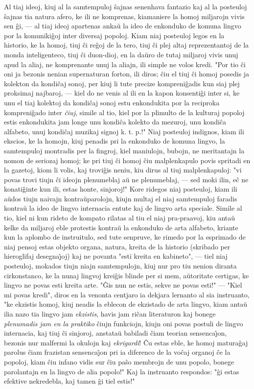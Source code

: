    Al tiaj ideoj, kiuj al la samtempuloj \^sajnas senenhava fantazio
kaj al la posteuloj \^sajnas tia natura afero, ke ili ne komprenas,
kiamaniere la homoj miljarojn vivis sen \^gi, --- al tiaj ideoj
apartenas anka\u u la ideo de enkonduko de komuna lingvo por la
komuniki\^goj inter diversaj popoloj. Kiam niaj posteuloj legos en
la historio, ke la homoj, tiuj \^ci re\^goj de la tero, tiuj \^ci
plej altaj reprezentantoj de la monda inteligenteco, tiuj \^ci
duon-dioj, en la da\u uro de tutaj miljaroj vivis unuj apud la
aliaj, ne komprenante unuj la aliajn, ili simple ne volos kredi.
"Por tio \^ci oni ja bezonis nenian supernaturan forton, ili diros;
\^ciu el tiuj \^ci homoj posedis ja kolekton da kondi\^caj sonoj,
per kiuj li tute precize kompreni\^gadis kun siaj plej proksimaj
najbaroj, --- kiel do ne venis al ili en la kapon konsenti\^gi inter
si, ke unu el tiaj kolektoj da kondi\^caj sonoj estu enkondukita por
la reciproka kompreni\^gado inter {\sl \^ciuj}, simile al tio, kiel
por la plimulto de la kulturaj popoloj estis enkondukita jam longe
unu kondi\^ca kolekto da mezuroj, unu kondi\^ca alfabeto, unuj
kondi\^caj muzikaj signoj k. t. p.!" Niaj posteuloj indignos, kiam
ili ekscios, ke la homojn, kiuj penadis pri la enkonduko de komuna
lingvo, la samtempuloj montradis per la fingroj, kiel maniulojn,
bubojn, ne meritantajn la nomon de seriozaj homoj; ke pri tiuj \^ci
homoj \^ciu malplenkapulo povis spritadi en la gazetoj, kiom li
volis, kaj trovi\^gis neniu, kiu dirus al tiuj malplenkapuloj: "vi
povas trovi tiujn \^ci ideojn plenumeblaj a\u u ne plenumeblaj,
--- sed moki ilin, e\^c ne konati\^ginte kun ili, estas honte,
sinjoroj!" Kore ridegos niaj posteuloj, kiam ili a\u udos tiujn
naivajn kontra\u uparolojn, kiujn multaj el niaj samtempuloj faradis
kontra\u u la ideo de lingvo internacia entute kaj de lingvo arta
speciale. Simile al tio, kiel ni kun rideto de kompato rilatas al
tiu el niaj pra-praavoj, kiu anta\u u kelke da miljaroj eble
protestis kontra\u u la enkonduko de arta alfabeto, kriante kun la
aplombo de instruitulo, sed tute senpruve, ke rimedo por la
esprimado de niaj pensoj estas objekto organa, natura, kreita de la
historio (skribado per hieroglifaj desegna\^{\j}oj) kaj ne povanta
"esti kreita en kabineto", --- tiel niaj posteuloj, mokados tiujn
niajn samtempulojn, kiuj nur pro tiu nenion diranta cirkonstanco, ke
la nunaj lingvoj krei\^gis blinde per si mem, a\u utoritate
certigas, ke lingvo ne povas esti kreita arte. "\^Gis nun ne estis,
sekve ne povas esti!" --- "Kiel mi povas kredi", diros en la
venonta centjaro ia dekjara lernanto al sia instruanto, "ke
ekzistis homoj, kiuj neadis la eblecon de ekzistado de arta lingvo,
kiam anta\u u ilia nazo tia lingvo jam {\sl ekzistis}, havis jam
ri\^can literaturon kaj bonege {\sl plenumadis jam en la praktiko}
\^ciujn funkciojn, kiujn oni povas postuli de lingvo internacia, kaj
tiuj \^ci sinjoroj, anstata\u u babiladi \^ciam teorian
sensenca\^{\j}on, bezonis nur malfermi la okulojn kaj {\sl
ekrigardi}! \^Cu estas eble, ke homoj matura\^gaj parolus \^ciam
frazistan sensenca\^{\j}on pri ia diferenco de la vo\^caj organoj
\^ce la popoloj, kiam \^ciu infano vidis sur \^ciu pa\^so membrojn
de unu popolo, bonege parolantajn en la lingvo de alia popolo!" Kaj
la instruanto respondos: "\^gi estas efektive nekredebla, kaj tamen
\^gi tiel estis!"

